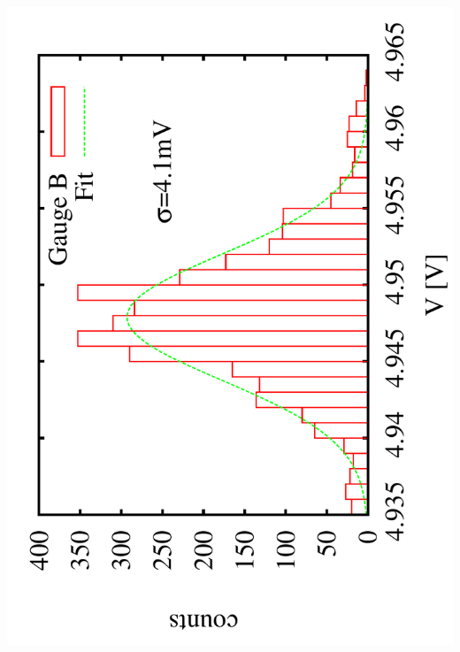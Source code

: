 \documentclass[a4paper,11pt]{book}
\begin{document}
 \includegraphics[scale=0.15,angle=-90]{image_ai_23e7.pdf}
\end{document}
